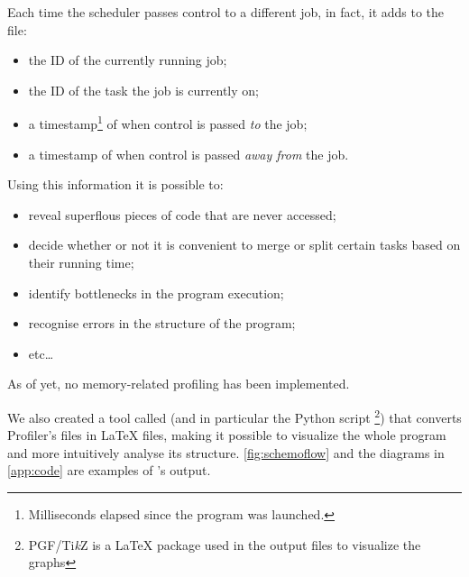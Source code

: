  \beforelist Each time the scheduler passes control to a different job, in fact, it
  adds to the file:
  \begin{itemize}
    \item the ID of the currently running job;
    \item the ID of the task the job is currently on;
    \item a timestamp\footnote{\label{clock_note}Milliseconds elapsed
    since the program was launched.} of when control is passed
    \textit{to} the job;
    \item a timestamp of when control is passed
    \textit{away from} the job.
  \end{itemize}
  \afterlist
  \beforelist Using this information it is possible to:
  \begin{itemize}
    \item reveal superflous pieces of code that are never accessed;
    \item decide whether or not it is convenient to merge or split
    certain tasks based on their running time;
    \item identify bottlenecks in the program execution;
    \item recognise errors in the structure of the program;
    \item etc\ldots
  \end{itemize}
  \afterlist
  As of yet, no memory-related profiling has been implemented.

  We also created a tool called \ScheMoTeX{} (and in particular the
  Python script \footnote{PGF/Ti\textit{k}Z is a
  \LaTeX{} package used in the output files to visualize the graphs})
  that converts \ScheMo{} Profiler's  files in \LaTeX{}
   files, making it possible to visualize the whole program
  and more intuitively analyse its structure. \autoref{fig:schemoflow}
  and the diagrams in \autoref{app:code} are examples of
  \ScheMoTeX{}'s output.
